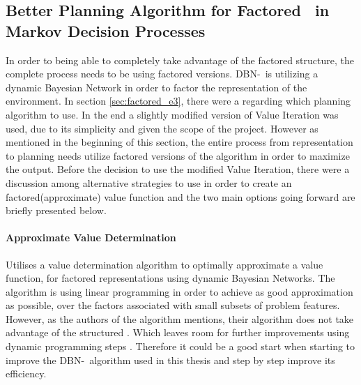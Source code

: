 \subsection{Better Planning Algorithm for Factored \etre\ in Markov Decision Processes }
\label{sec:better_planing_algos}
In order to being able to completely take advantage of the factored structure, the complete process needs to be using factored versions. DBN-\etre\ is utilizing a dynamic Bayesian Network in order to factor the representation of the environment. In section \ref{sec:factored_e3}, there were a  regarding which planning algorithm to use. In the end a slightly modified version of Value Iteration was used, due to its simplicity and given the scope of the project. 
However as mentioned in the beginning of this section, the entire process from representation to planning needs utilize factored versions of the algorithm in order to maximize the output. Before the decision to use the modified Value Iteration, there were a discussion among alternative strategies to use in order to create an factored(approximate) value function and the two main options going forward are briefly presented below.




\paragraph{Approximate Value Determination}
Utilises a value determination algorithm to optimally approximate a value function, for factored representations using dynamic Bayesian Networks. The algorithm is using linear programming in order to achieve as good approximation as possible, over the factors associated with small subsets of problem features. However, as the authors of the algorithm mentions, their algorithm does not take advantage of the structured . Which leaves room for further improvements using dynamic programming steps \parencite{koller1999computing}. Therefore it could be a good start when starting to improve the DBN-\etre\ algorithm used in this thesis and step by step improve its efficiency. 

